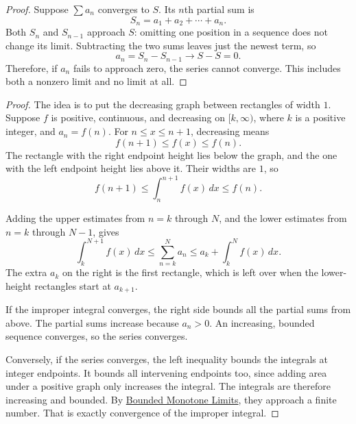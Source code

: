 
\begin{proof}
Suppose $\sum a_n$ converges to $S$. Its $n$th partial sum is
$$S_n=a_1+a_2+\cdots+a_n.$$
Both $S_n$ and $S_{n-1}$ approach $S$: omitting one position in a
sequence does not change its limit. Subtracting the two sums leaves
just the newest term, so
$$a_n=S_n-S_{n-1}\longrightarrow S-S=0.$$
Therefore, if $a_n$ fails to approach zero, the series cannot converge.
This includes both a nonzero limit and no limit at all.
\end{proof}


\begin{proof}
The idea is to put the decreasing graph between rectangles of width
$1$. Suppose $f$ is positive, continuous, and decreasing on
$[k,\infty)$, where $k$ is a positive integer, and $a_n=f(n)$.
For $n\leq x\leq n+1$, decreasing means
$$f(n+1)\leq f(x)\leq f(n).$$
The rectangle with the right endpoint height lies below the graph, and
the one with the left endpoint height lies above it. Their widths are
$1$, so
$$f(n+1)\leq\int_n^{n+1}f(x)\,dx\leq f(n).$$

Adding the upper estimates from $n=k$ through $N$, and the lower
estimates from $n=k$ through $N-1$, gives
$$
\int_k^{N+1}f(x)\,dx\leq\sum_{n=k}^N a_n
\leq a_k+\int_k^N f(x)\,dx.
$$
The extra $a_k$ on the right is the first rectangle, which is left over
when the lower-height rectangles start at $a_{k+1}$.

If the improper integral converges, the right side bounds all the
partial sums from above. The partial sums increase because $a_n>0$.
An increasing, bounded sequence converges, so the series converges.

Conversely, if the series converges, the left inequality bounds the
integrals at integer endpoints. It bounds all intervening endpoints too,
since adding area under a positive graph only increases the integral.
The integrals are therefore increasing and bounded. By
\hyperref[sec:bounded-monotone-limits]{Bounded Monotone Limits}, they
approach a finite number. That is exactly convergence of the improper
integral.
\end{proof}


